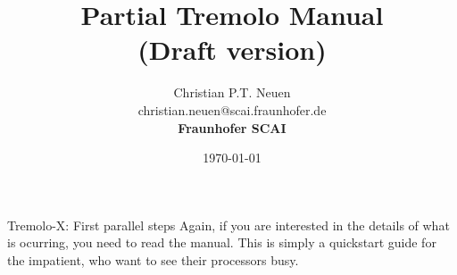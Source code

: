 \documentclass[a4paper, 11pt]{report}
\date{\today}
\title{Partial Tremolo Manual\\ (Draft version)}
\author{Christian P.T. Neuen\\christian.neuen@scai.fraunhofer.de\\{\Large{}\bf Fraunhofer SCAI}}
\begin{document}
{\huge Tremolo-X: First parallel steps}
\bigbreak
{\small Again, if you are interested in the details of what is ocurring, you need to read the manual. 
This is simply a quickstart guide for the impatient, who want to see their processors busy.}
\bigbreak







%
%







\end{document}
